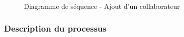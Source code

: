 \begin{figure}[H]
\caption{Diagramme de séquence - Ajout d'un collaborateur}
\end{figure}

\vspace{0.5cm}

\subsubsection{Description du processus}

